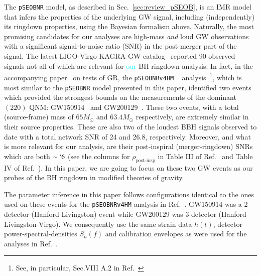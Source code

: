 \documentclass[twocolumn,
               prd,
               aps,
               superscriptaddress,
               tightenlines,
               nofootinbib,
               eqsecnum,
               amsfonts,
               amsmath,
               longbibliography]{revtex4-1}
\newcommand{\Mo}{M_{\odot}}
\newcommand{\pSEOB}{\texttt{pSEOBNR}}
\newcommand{\ab}[1]{{\textcolor{cyan}{{#1}} }}
\begin{document}
The \pSEOB{} model, as described in Sec.~\ref{sec:review_pSEOB}, is an
IMR model that infers the properties of the underlying GW signal,
including (independently) its ringdown properties, using the Bayesian formalism
above. Naturally, the most promising candidates for our analyses are high-mass
\emph{and} loud GW observations with a significant signal-to-noise ratio (SNR)
in the post-merger part of the signal.
%
The latest LIGO-Virgo-KAGRA GW catalog~\cite{LIGOScientific:2021djp} reported 90 observed
signals not all of which are relevant for \ab{our} BH ringdown analysis. In fact, in
the accompanying paper~\cite{LIGOScientific:2021sio} on tests of GR, the \texttt{pSEOBNRv4HM}
~\cite{Brito:2018rfr,Ghosh:2021mrv} analysis~\footnote{See, in particular, Sec.VIII A.2
in Ref.~\cite{LIGOScientific:2021sio}}, which is most similar to the \pSEOB{} model
presented in this paper, identified two events which provided the strongest
bounds on the measurements of the dominant $(220)$ QNM:
GW150914~\cite{LIGOScientific:2016aoc} and
GW200129~\cite{LIGOScientific:2021djp}.
%
These two events, with a total (source-frame) mass of $65 \Mo$ and $63.4 \Mo$ respectively, are
extremely similar in their source properties. These are also two of the loudest
BBH signals observed to date with a total network SNR of 24 and 26.8, 
respectively.
%
Moreover, and what is more relevant for our analysis, are their post-inspiral
(merger-ringdown) SNRs which are both $\sim `6$ (see the columns for
$\rho_{\text{post-insp}}$ in Table III of Ref.~\cite{LIGOScientific:2019fpa} and
Table IV of Ref.~\cite{LIGOScientific:2021sio}).
%
In this paper, we are going to focus on these two GW events as our probes of
the BH ringdown in modified theories of gravity.

The parameter inference in this paper follows configurations identical to the
ones used on these events for the \texttt{pSEOBNRv4HM} analysis in
Ref.~\cite{LIGOScientific:2021sio}. GW150914 was a 2-detector (Hanford-Livingston) event while
GW200129 was 3-detector (Hanford-Livingston-Virgo).
%
We consequently use the same strain data $h(t)$, detector
power-spectral-densities $S_n(f)$ and calibration envelopes as were used for
the analyses in Ref.~\cite{LIGOScientific:2021sio}.
%
%
\end{document}
